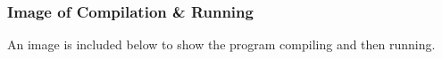 \documentclass[a4paper, 12pt]{article}
\begin{document}
      \subsubsection{Image of Compilation \& Running}
        An image is included below to show the program compiling and then
          running.

  \newpage
  \printbibliography[%
    heading=bibintoc,%
    title={Works Consulted}%
  ]
\end{document}
